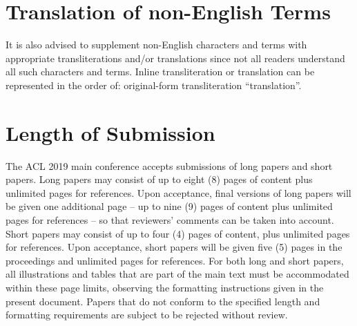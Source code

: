 \documentclass[11pt,a4paper]{article}
\begin{document}


\section{Translation of non-English Terms}

It is also advised to supplement non-English characters and terms
with appropriate transliterations and/or translations
since not all readers understand all such characters and terms.
Inline transliteration or translation can be represented in
the order of: original-form transliteration ``translation''.

\section{Length of Submission}
\label{sec:length}

The ACL 2019 main conference accepts submissions of long papers and
short papers.
 Long papers may consist of up to eight (8) pages of
content plus unlimited pages for references. Upon acceptance, final
versions of long papers will be given one additional page -- up to nine (9)
pages of content plus unlimited pages for references -- so that reviewers' comments
can be taken into account. Short papers may consist of up to four (4)
pages of content, plus unlimited pages for references. Upon
acceptance, short papers will be given five (5) pages in the
proceedings and unlimited pages for references. 
For both long and short papers, all illustrations and tables that are part
of the main text must be accommodated within these page limits, observing
the formatting instructions given in the present document. Papers that do not conform to the specified length and formatting requirements are subject to be rejected without review.
\end{document}
